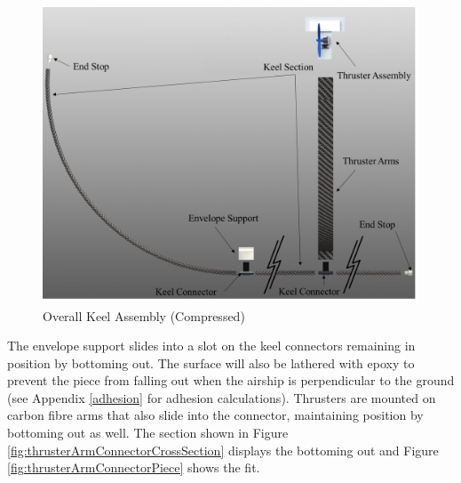 \documentclass[../main.tex]{subfiles}
\begin{document}
\begin{figure}[H]
	\centering
	\includegraphics[width=.8\linewidth]{img/design/keel/keelAssemblyCompressedThruster.png}
	\caption{Overall Keel Assembly (Compressed)}
	\label{fig:keelAssemblyCompressedThruster}
\end{figure}

The envelope support slides into a slot on the keel connectors remaining in position by bottoming out. The surface will also be lathered with epoxy to prevent the piece from falling out when the airship is perpendicular to the ground (see Appendix \ref{adhesion} for adhesion calculations). Thrusters are mounted on carbon fibre arms that also slide into the connector, maintaining position by bottoming out as well. The section shown in Figure \ref{fig:thrusterArmConnectorCrossSection} displays the bottoming out and Figure \ref{fig:thrusterArmConnectorPiece} shows the fit.
\end{document}
